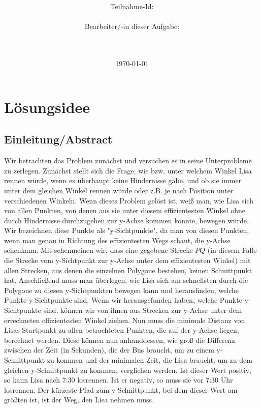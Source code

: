 \documentclass[a4paper,10pt,ngerman]{scrartcl}
\title{\textbf{\Huge\Aufgabe}}
\author{\LARGE Teilnahme-Id: \LARGE \TeilnahmeId \\\\
	    \LARGE Bearbeiter/-in dieser Aufgabe: \\ 
	    \LARGE \Namen\\\\}
\date{\LARGE\today}
\begin{document}
\maketitle
\tableofcontents

\vspace{0.5cm}

\section{Lösungsidee}
\subsection{Einleitung/Abstract}
Wir betrachten das Problem zunächst und versuchen es in seine Unterprobleme zu zerlegen. Zunächst stellt sich die Frage, wie bzw. unter welchem Winkel Lisa rennen würde, wenn es überhaupt keine Hindernisse gäbe, und ob sie immer unter dem gleichen Winkel rennen würde oder z.B. je nach Position unter verschiedenen Winkeln. Wenn dieses Problem gelöst ist, weiß man, wie Lisa sich von allen Punkten, von denen aus sie unter diesem effizientesten Winkel ohne durch Hindernisse durchzugehen zur y-Achse kommen könnte, bewegen würde. Wir bezeichnen diese Punkte als "y-Sichtpunkte", da man von diesen Punkten, wenn man genau in Richtung des effizientesten Wegs schaut, die y-Achse \glqq sehen\grqq{ }kann. Mit \glqq sehen\grqq{ }meinen wir, dass eine gegebene Strecke $\overline{PQ}$ (in diesem Falle die Strecke vom y-Sichtpunkt zur y-Achse unter dem effizientesten Winkel) mit allen Strecken, aus denen die einzelnen Polygone bestehen, keinen Schnittpunkt hat. Anschließend muss man überlegen, wie Lisa sich am schnellsten durch die Polygone zu diesen y-Sichtpunkten bewegen kann und herausfinden, welche Punkte y-Sichtpunkte sind. Wenn wir herausgefunden haben, welche Punkte y-Sichtpunkte sind, können wir von ihnen aus Strecken zur y-Achse unter dem errechneten effizientesten Winkel ziehen. Nun muss die minimale Distanz von Lisas Startpunkt zu allen betrachteten Punkten, die auf der y-Achse liegen, berechnet werden. Diese können nun anhanddessen, wie groß die Differenz zwischen der Zeit (in Sekunden), die der Bus braucht, um zu einem y-Schnittpunkt zu kommen und der minimalen Zeit, die Lisa braucht, um zu dem gleichen y-Schnittpunkt zu kommen, verglichen werden. Ist dieser Wert positiv, so kann Lisa nach 7:30 losrennen. Ist er negativ, so muss sie vor 7:30 Uhr losrennen. Der kürzeste Pfad zum y-Schnittpunkt, bei dem dieser Wert am größten ist, ist der Weg, den Lisa nehmen muss.
\end{document}
